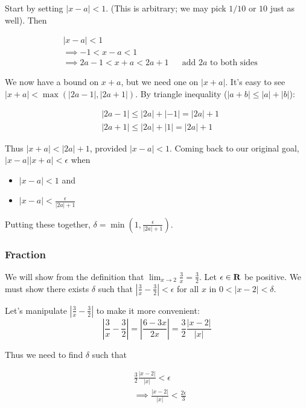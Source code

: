 Start by setting $|x-a|<1$. (This is arbitrary; we may pick $1/10$ or
$10$ just as well). Then

\begin{align*}
    &|x-a|<1\\
    &\implies -1<x-a<1\\
    &\implies 2a-1<x+a<2a+1&&\text{add $2a$ to both sides}
\end{align*}

We now have a bound on $x+a$, but we need one on $|x+a|$. It's easy to
see $|x+a|<\max(|2a-1|, |2a+1|)$. By triangle inequality
($|a+b|\leq|a|+|b|$):

\begin{align*}
    &|2a-1|\leq|2a|+|-1|=|2a|+1\\
    &|2a+1|\leq|2a|+|1|=|2a|+1
\end{align*}

Thus $|x+a|<|2a|+1$, provided $|x-a|<1$. Coming back to our original
goal, $|x-a||x+a|<\epsilon$ when

\begin{itemize}
    \item $|x-a|<1$ and
    \item $|x-a|<\frac{\epsilon}{|2a|+1}$
\end{itemize}

Putting these together, $\delta=\min(1, \frac{\epsilon}{|2a|+1})$.

\subsubsection{Fraction}

We will show from the definition that
$\lim_{x\to 2}\frac{3}{x}=\frac{3}{2}$. Let $\epsilon\in\mathbf{R}$ be positive. We must
show there exists $\delta$ such that
$|\frac{3}{x}-\frac{3}{2}|<\epsilon$ for all $x$ in $0<|x-2|<\delta$.

\vs

Let's manipulate $|\frac{3}{x}-\frac{3}{2}|$ to make it more convenient:
\[\left|\frac{3}{x}-\frac{3}{2}\right|=\left|\frac{6-3x}{2x}\right|=\frac{3}{2}\frac{|x-2|}{|x|}\]

Thus we need to find $\delta$ such that

\begin{align*}
&\frac{3}{2}\frac{|x-2|}{|x|}<\epsilon\\
&\implies \frac{|x-2|}{|x|}<\frac{2\epsilon}{3}\\
\end{align*}


